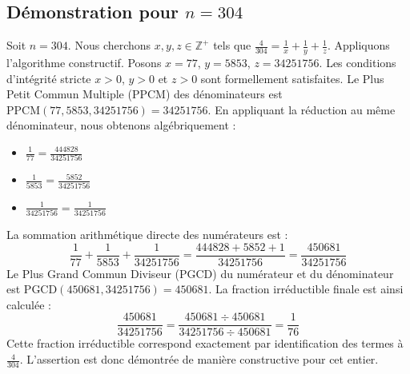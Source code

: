 \documentclass[11pt,a4paper]{article}
\begin{document}
\subsection{Démonstration pour $n = 304$}
Soit $n = 304$. Nous cherchons $x, y, z \in \mathbb{Z}^{+}$ tels que $\frac{4}{304} = \frac{1}{x} + \frac{1}{y} + \frac{1}{z}$.
Appliquons l'algorithme constructif. Posons $x = 77$, $y = 5853$, $z = 34251756$.
Les conditions d'intégrité stricte $x > 0$, $y > 0$ et $z > 0$ sont formellement satisfaites.
Le Plus Petit Commun Multiple (PPCM) des dénominateurs est $\text{PPCM}(77, 5853, 34251756) = 34251756$.
En appliquant la réduction au même dénominateur, nous obtenons algébriquement :
\begin{itemize}
    \item $\frac{1}{77} = \frac{444828}{34251756}$
    \item $\frac{1}{5853} = \frac{5852}{34251756}$
    \item $\frac{1}{34251756} = \frac{1}{34251756}$
\end{itemize}
La sommation arithmétique directe des numérateurs est :
$$ \frac{1}{77} + \frac{1}{5853} + \frac{1}{34251756} = \frac{444828 + 5852 + 1}{34251756} = \frac{450681}{34251756} $$
Le Plus Grand Commun Diviseur (PGCD) du numérateur et du dénominateur est $\text{PGCD}(450681, 34251756) = 450681$.
La fraction irréductible finale est ainsi calculée :
$$ \frac{450681}{34251756} = \frac{450681 \div 450681}{34251756 \div 450681} = \frac{1}{76} $$
Cette fraction irréductible correspond exactement par identification des termes à $\frac{4}{304}$. L'assertion est donc démontrée de manière constructive pour cet entier.
\end{document}
